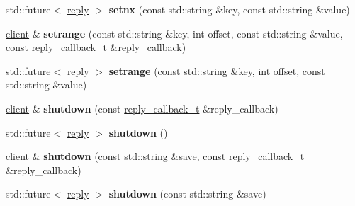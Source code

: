 \begin{DoxyCompactItemize}
\mbox{\label{classcpp__redis_1_1client_a1ab0db92e48716812e4b30b268ce29ea}} 
std\+::future$<$ \mbox{\hyperlink{classcpp__redis_1_1reply}{reply}} $>$ {\bfseries setnx} (const std\+::string \&key, const std\+::string \&value)
\item 
\mbox{\label{classcpp__redis_1_1client_a3c1a2d69d9473de409f9102b61496f47}} 
\mbox{\hyperlink{classcpp__redis_1_1client}{client}} \& {\bfseries setrange} (const std\+::string \&key, int offset, const std\+::string \&value, const \mbox{\hyperlink{classcpp__redis_1_1client_af7a65eb21aa25230bfbb0b0203c4fc04}{reply\+\_\+callback\+\_\+t}} \&reply\+\_\+callback)
\item 
\mbox{\label{classcpp__redis_1_1client_a628f79b8f8e424cdd4b70c076c21338a}} 
std\+::future$<$ \mbox{\hyperlink{classcpp__redis_1_1reply}{reply}} $>$ {\bfseries setrange} (const std\+::string \&key, int offset, const std\+::string \&value)
\item 
\mbox{\label{classcpp__redis_1_1client_acdb7064ddc309b1dbc6681ae559cc189}} 
\mbox{\hyperlink{classcpp__redis_1_1client}{client}} \& {\bfseries shutdown} (const \mbox{\hyperlink{classcpp__redis_1_1client_af7a65eb21aa25230bfbb0b0203c4fc04}{reply\+\_\+callback\+\_\+t}} \&reply\+\_\+callback)
\item 
\mbox{\label{classcpp__redis_1_1client_ae457a1b446eff2e264452eb35de72d37}} 
std\+::future$<$ \mbox{\hyperlink{classcpp__redis_1_1reply}{reply}} $>$ {\bfseries shutdown} ()
\item 
\mbox{\label{classcpp__redis_1_1client_aca186e9b705a566203a47e8b29f99a28}} 
\mbox{\hyperlink{classcpp__redis_1_1client}{client}} \& {\bfseries shutdown} (const std\+::string \&save, const \mbox{\hyperlink{classcpp__redis_1_1client_af7a65eb21aa25230bfbb0b0203c4fc04}{reply\+\_\+callback\+\_\+t}} \&reply\+\_\+callback)
\item 
\mbox{\label{classcpp__redis_1_1client_a8587aeb1044e85ae580cd9661ea826dc}} 
std\+::future$<$ \mbox{\hyperlink{classcpp__redis_1_1reply}{reply}} $>$ {\bfseries shutdown} (const std\+::string \&save)
\item 

\end{DoxyCompactItemize}
